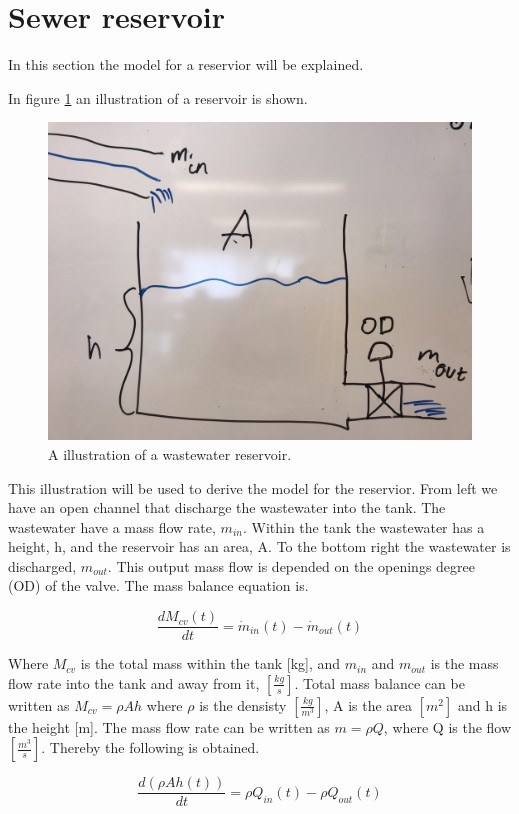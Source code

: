 \section{Sewer reservoir}\label{se:sewer_reservoir}
In this section the model for a reservior will be explained. 

In figure \ref{fig:tank_model} an illustration of a reservoir is shown.
\begin{figure}[H]
\centering
\includegraphics[width=.6\textwidth]{report/modeling/pictures/tank_model.jpg}
\caption{A illustration of a wastewater reservoir.}
\label{fig:tank_model}
\end{figure} 

This illustration will be used to derive the model for the reservior. From left we have an open channel that discharge the wastewater into the tank. The wastewater have a mass flow rate, $m_{in}$. Within the tank the wastewater has a height, h, and the reservoir has an area, A. To the bottom right the wastewater is discharged, $m_{out}$. This output mass flow is depended on the openings degree (OD) of the valve. The mass balance equation is.


\begin{equation}
	 	\frac{dM_{cv}(t)}{dt}=\dot{m}_{in}(t)-\dot{m}_{out}(t)
\end{equation} 

Where $M_{cv}$ is the total mass within the tank [kg], and $m_{in}$ and $m_{out}$ is the mass flow rate into the tank and away from it, $\left[\frac{kg}{s}\right]$. Total mass balance can be written as $M_{cv} = \rho Ah$ where $\rho$ is the densisty $\left[\frac{kg}{m^3}\right]$, A is the area $\left[m^2\right]$ and h is the height [m]. The mass flow rate can be written as $m = \rho Q$, where Q is the flow $\left[\frac{m^3}{s}\right]$. Thereby the following is obtained.

\begin{equation}
		\frac{d(\rho Ah(t))}{dt}=\rho Q_{in}(t)-\rho Q_{out}(t)
\end{equation}

